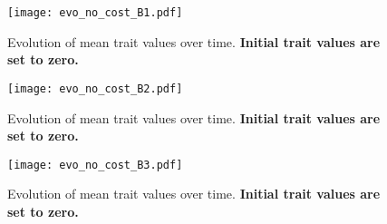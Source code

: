 \documentclass[12pt]{article}
\begin{document}
\begin{figure}
\begin{center}				
\texttt{[image: evo\_no\_cost\_B1.pdf]}
\end{center}
\caption{Evolution of mean trait values over time. \textbf{Initial trait values are set to zero.}}
\end{figure}

\clearpage


\begin{figure}
\begin{center}		
\texttt{[image: evo\_no\_cost\_B2.pdf]}
\end{center}
\caption{Evolution of mean trait values over time. \textbf{Initial trait values are set to zero.}}
\end{figure}

\begin{figure}
\begin{center}				
\texttt{[image: evo\_no\_cost\_B3.pdf]}
\end{center}
\caption{Evolution of mean trait values over time. \textbf{Initial trait values are set to zero.}}
\end{figure}

\clearpage

\end{document}
